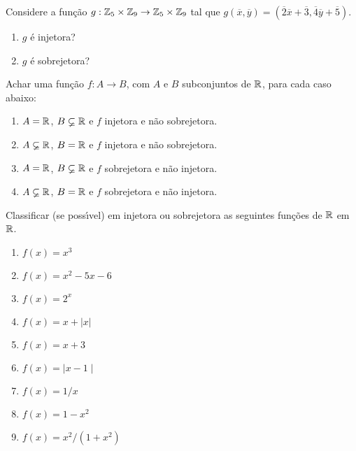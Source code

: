 \documentclass[12pt]{exam}
\begin{document}
    \questao{} Considere a fun{\c c}{\~a}o $g : \mathbb{Z}_5 \times \mathbb{Z}_9 \to \mathbb{Z}_5 \times \mathbb{Z}_9$ tal que $g(\overline{x},\overline{y}) = (\overline{2} \overline{x} + \overline{3}, \overline{4}\overline{y} + \overline{5})$.
    \begin{enumerate}[label={\alph*})]
        \item $g$ \'e injetora?

        \item $g$ \'e sobrejetora?
    \end{enumerate}

    \vspace{.3cm}

    \questao{} Achar uma fun{\c c}{\~a}o $f : A \to B$, com $A$ e $B$ subconjuntos de $\mathbb{R}$, para cada caso abaixo:
    \begin{enumerate}[label={\alph*})]
        \item $A = \mathbb{R}$, $B \varsubsetneq \mathbb{R}$ e $f$ injetora e n{\~a}o sobrejetora.

        \item $A \varsubsetneq \mathbb{R}$, $B = \mathbb{R}$ e $f$ injetora e n{\~a}o sobrejetora.

        \item $A = \mathbb{R}$, $B \varsubsetneq \mathbb{R}$ e $f$ sobrejetora e n{\~a}o injetora.

        \item $A \varsubsetneq \mathbb{R}$, $B = \mathbb{R}$ e $f$ sobrejetora e n{\~a}o injetora.
    \end{enumerate}

    \vspace{.3cm}

    \questao{} Classificar (se poss{\'\i}vel) em injetora ou sobrejetora as seguintes fun{\c c}{\~o}es de $\mathbb{R}$ em $\mathbb{R}$.

    \begin{multicols}{2}
        \begin{enumerate}[label={\alph*})]
            \item $f(x) = x^3$

            \item $f(x) = x^2 - 5x - 6$

            \item $f(x) = 2^x$

            \item $f(x) = x + | x |$

            \item $f(x) = x + 3$

            \item $f(x) = \mid x - 1\mid$

            \item $f(x) = 1/x$

            \item $f(x) = 1 - x^2$

            \item $f(x) = x^2/(1 + x^2)$
        \end{enumerate}
    \end{multicols}
\end{document}

